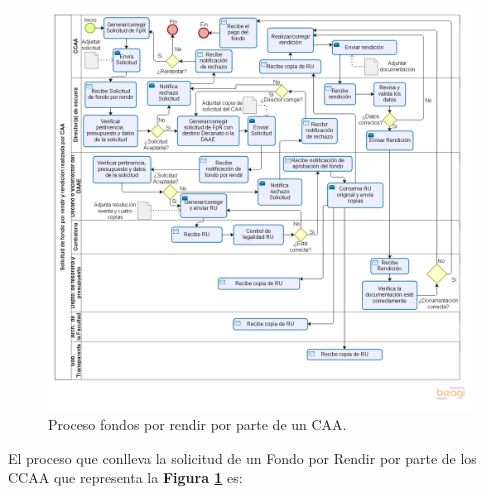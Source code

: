 \begin{figure}[tb!]
    \hspace{-9mm}
    \includegraphics[width=1.1\textwidth]{Imagenes/Solicitud_CCAA.png}
    \caption{\label{fig: Solicitud_CAA}Proceso fondos por rendir por parte de un CAA.}
\end{figure}

El proceso que conlleva la solicitud de un Fondo por Rendir por parte de los CCAA que representa la \textbf{Figura \ref{fig: Solicitud_CAA}} es:

